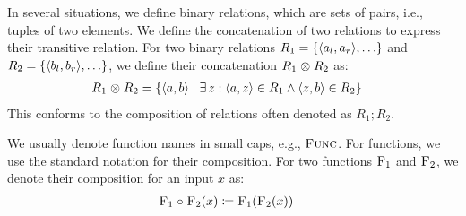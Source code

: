 In several situations, we define binary relations, which are sets of pairs, i.e., tuples of two elements.
We define the concatenation of two relations to express their transitive relation.
For two binary relations $R_1 = \setted{\tupled{a_{l}, a_{r}}, %
\dots}$ and $R_2 = \setted{\tupled{b_{l}, b_{r}}, %
\dots}$, we define their concatenation $R_1 \mathrel{\otimes} R_2$ as:
\begin{align*}
    &
    R_1 \concat R_2 = \setted{\tupled{a,b} \mid \exists z : \tupled{a,z} \in R_1 \land \tupled{z,b} \in R_2}
\end{align*}
This conforms to the composition of relations often denoted as $R_1 ; R_2$.

We usually denote function names in small caps, e.g., $\textsc{Func}$.
For functions, we use the standard notation for their composition. For two functions $\textsc{F}_{1}$ and $\textsc{F}_{2}$, we denote their composition for an input $x$ as:
\begin{align*}
    &
    \textsc{F}_{1} \mathrel{\circ} \textsc{F}_{2}(x) \coloneqq \textsc{F}_{1}(\textsc{F}_{2}(x))
\end{align*}






